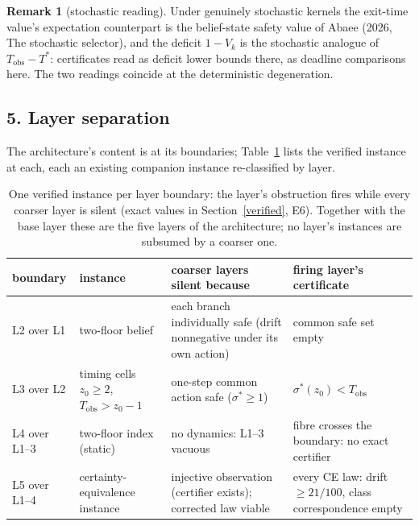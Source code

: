 \documentclass[10pt,twocolumn]{article}
\theoremstyle{definition}
\newtheorem{remark}{Remark}
\begin{document}
\begin{remark}[stochastic reading]\label{rem:stoch}
Under genuinely stochastic kernels the exit-time value's expectation
counterpart is the belief-state safety value of Abaee (2026, The stochastic selector), and the
deficit \(1 - V_{k}\) is the stochastic analogue of
\(T_{\mathrm{obs}} - T^{*}\): certificates read as deficit lower bounds
there, as deadline comparisons here. The two readings coincide at the
deterministic degeneration.
\end{remark}

\subsection{5. Layer separation}\label{sep}

The architecture's content is at its boundaries; Table~\ref{tab:sep}
lists the verified instance at each, each an existing companion instance
re-classified by layer.

\begin{table}[t]
\centering
\footnotesize
\begin{tabular}{@{}>{\raggedright\arraybackslash}p{16mm}|>{\raggedright\arraybackslash}p{40mm}|>{\raggedright\arraybackslash}p{42mm}|>{\raggedright\arraybackslash}p{40mm}@{}}
\toprule
boundary & instance & coarser layers silent because & firing layer's certificate \\
\midrule
L2 over L1 & two-floor belief & each branch individually safe (drift
nonnegative under its own action) & common safe set empty \\
L3 over L2 & timing cells \(z_{0} \ge 2\), \(T_{\mathrm{obs}} > z_{0}-1\)
& one-step common action safe (\(\sigma^{*} \ge 1\)) &
\(\sigma^{*}(z_{0}) < T_{\mathrm{obs}}\) \\
L4 over L1--3 & two-floor index (static) & no dynamics: L1--3 vacuous &
fibre crosses the boundary: no exact certifier \\
L5 over L1--4 & certainty-equivalence instance & injective observation
(certifier exists); corrected law viable &
every CE law: drift \(\ge 21/100\), class correspondence empty \\
\bottomrule
\end{tabular}
\caption{One verified instance per layer boundary: the layer's obstruction
fires while every coarser layer is silent (exact values in
Section~\ref{verified}, E6). Together with the base layer these are the
five layers of the architecture; no layer's instances are subsumed by a
coarser one.}
\label{tab:sep}
\end{table}
\end{document}
